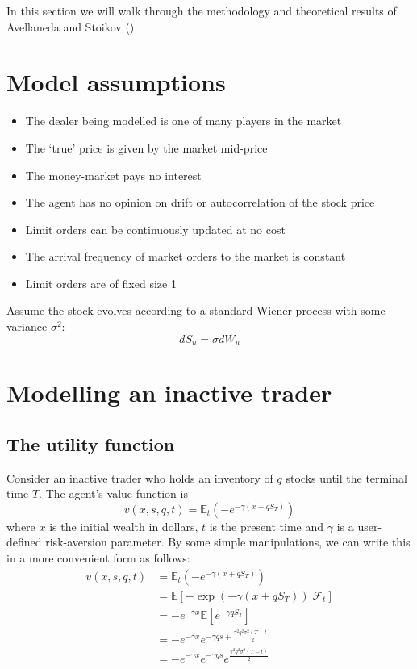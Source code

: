 In this section we will walk through the methodology and theoretical
results of Avellaneda and Stoikov (\cite{as})

\section{Model assumptions}

\begin{itemize}
    \item The dealer being modelled is one of many players in the market
    \item The `true' price is given by the market mid-price
    \item The money-market pays no interest
    \item The agent has no opinion on drift or autocorrelation of the stock price
    \item Limit orders can be continuously updated at no cost
    \item The arrival frequency of market orders to the market is constant
    \item Limit orders are of fixed size 1
\end{itemize}

Assume the stock evolves according to a standard Wiener process with some variance $\sigma^2$: 
$$dS_u=\sigma dW_u$$

\section{Modelling an inactive trader}
\subsection*{The utility function}

Consider an inactive trader who holds an inventory of $q$ stocks until the terminal time $T.$ The agent's value function is
$$v(x,s,q,t)=\mathbb{E}_t\left(-e^{-\gamma(x+qS_T)}\right)$$
where $x$ is the initial wealth in dollars, $t$ is the present time and $\gamma$ is a user-defined risk-aversion parameter.
By some simple manipulations, we can write this in a more convenient form as follows:
\begin{align*}
    v(x,s,q,t)&=\mathbb{E}_t\left(-e^{-\gamma(x+qS_T)}\right)\\
    &=\mathbb{E}\left[-\exp(-\gamma(x+qS_T))|\mathcal{F}_t\right]\\
    &=-e^{-\gamma x}\mathbb{E}\left[e^{-\gamma q S_T}\right]\\
    &=-e^{-\gamma x}e^{-\gamma q s + \frac{\gamma^2q^2\sigma^2(T-t)}{2}}\\
    &=-e^{-\gamma x}e^{-\gamma q s}e^{\frac{\gamma^2q^2\sigma^2(T-t)}{2}}
\end{align*}

